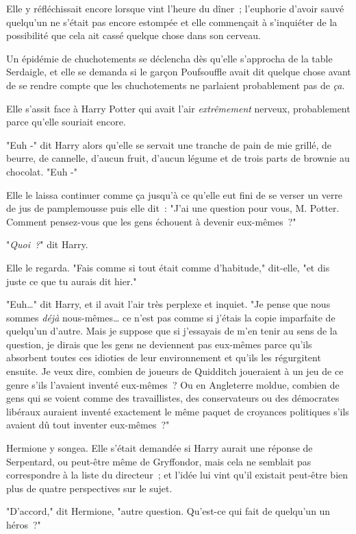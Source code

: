 \later

Elle y réfléchissait encore lorsque vint l'heure du dîner~; l'euphorie d'avoir sauvé quelqu'un ne s'était pas encore estompée et elle commençait à s'inquiéter de la possibilité que cela ait cassé quelque chose dans son cerveau.

Un épidémie de chuchotements se déclencha dès qu'elle s'approcha de la table Serdaigle, et elle se demanda si le garçon Poufsouffle avait dit quelque chose avant de se rendre compte que les chuchotements ne parlaient probablement pas de \emph{ça}.

Elle s'assit face à Harry Potter qui avait l'air \emph{extrêmement} nerveux, probablement parce qu'elle souriait encore.

"Euh -" dit Harry alors qu'elle se servait une tranche de pain de mie grillé, de beurre, de cannelle, d'aucun fruit, d'aucun légume et de trois parts de brownie au chocolat. "Euh -"

Elle le laissa continuer comme ça jusqu'à ce qu'elle eut fini de se verser un verre de jus de pamplemousse puis elle dit~: "J'ai une question pour vous, M. Potter. Comment pensez-vous que les gens échouent à devenir eux-mêmes~?"

"\emph{Quoi~?}" dit Harry.

Elle le regarda. "Fais comme si tout était comme d'habitude," dit-elle, "et dis juste ce que tu aurais dit hier."

"Euh…" dit Harry, et il avait l'air très perplexe et inquiet. "Je pense que nous sommes \emph{déjà} nous-mêmes… ce n'est pas comme si j'étais la copie imparfaite de quelqu'un d'autre. Mais je suppose que si j'essayais de m'en tenir au sens de la question, je dirais que les gens ne deviennent pas eux-mêmes parce qu'ils absorbent toutes ces idioties de leur environnement et qu'ils les régurgitent ensuite. Je veux dire, combien de joueurs de Quidditch joueraient à un jeu de ce genre s'ils l'avaient inventé eux-mêmes~? Ou en Angleterre moldue, combien de gens qui se voient comme des travaillistes, des conservateurs ou des démocrates libéraux auraient inventé exactement le même paquet de croyances politiques s'ils avaient dû tout inventer eux-mêmes~?"

Hermione y songea. Elle s'était demandée si Harry aurait une réponse de Serpentard, ou peut-être même de Gryffondor, mais cela ne semblait pas correspondre à la liste du directeur~; et l'idée lui vint qu'il existait peut-être bien plus de quatre perspectives sur le sujet.

"D'accord," dit Hermione, "autre question. Qu'est-ce qui fait de quelqu'un un héros~?"

